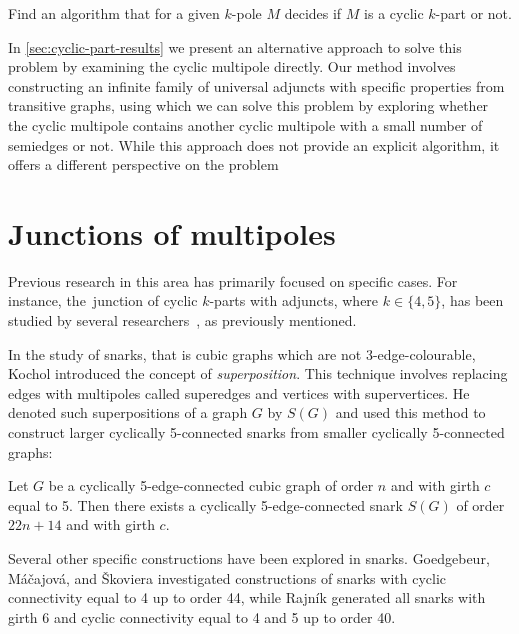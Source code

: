\documentclass[12pt, twoside]{book}
\begin{document}
\begin{problem}\label{problem:cyclic-part-algorithm}
	Find an algorithm that for a given $k$-pole $M$ decides if $M$ is a cyclic $k$-part or not.
\end{problem}

In \cref{sec:cyclic-part-results} we present an alternative approach to solve this problem by examining the cyclic multipole directly. Our method involves constructing an infinite family of universal adjuncts with specific properties from transitive graphs, using which we can solve this problem by exploring whether the cyclic multipole contains another cyclic multipole with a small number of semiedges or not. While this approach does not provide an explicit algorithm, it offers a different perspective on the problem

\section{Junctions of multipoles}

Previous research in this area has primarily focused on specific cases. For instance, the~junction of cyclic $k$-parts with adjuncts, where $k\in\{4,5\}$, has been studied by several researchers~\cite{Andersen1988, Rajnik_phd}, as previously mentioned.

In the study of snarks, that is cubic graphs which are not 3-edge-colourable, Kochol introduced the concept of \textit{superposition}. This technique involves replacing edges with multipoles called superedges and vertices with supervertices. He denoted such superpositions of a graph $G$ by $S(G)$ and used this method to construct larger cyclically 5-connected snarks from smaller cyclically 5-connected graphs:

\begin{theorem}
	Let $G$ be a cyclically 5-edge-connected cubic graph of order $n$ and with girth $c$ equal to 5. Then there exists a cyclically \mbox{5-edge-connected} snark $S(G)$ of order $22n+14$ and with girth $c$.
\end{theorem}

Several other specific constructions have been explored in snarks. Goedgebeur, Máčajová, and Škoviera \cite{Goedgebeur2019, Goedgebeur2020} investigated constructions of snarks with cyclic connectivity equal to 4 up to order 44, while Rajník \cite{Rajnik_mgr} generated all snarks with girth 6 and cyclic connectivity equal to 4 and 5 up to order 40.
\end{document}
